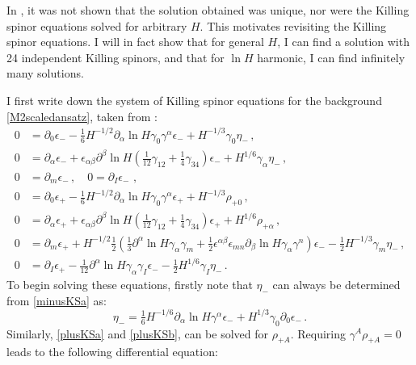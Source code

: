 \documentclass[11pt]{article}
\newcommand{\be}{\begin{equation}}
\newcommand{\ee}{\end{equation}}
\numberwithin{equation}{section}
\begin{document}
{{In \cite{Bergshoeff:2024nin}, it was not shown that the solution obtained was unique, nor were the Killing spinor equations solved for arbitrary $H$.
This motivates revisiting the Killing spinor equations.
I will in fact show that for general $H$, I can find a solution with 24 independent Killing spinors, and that for $\ln H$ harmonic, I can find infinitely many solutions.


I first write down the system of Killing spinor equations for the background \eqref{M2scaledansatz}, taken from \cite{Bergshoeff:2024nin}:
\begin{subequations}
\begin{align}
\label{minusKSa}
0 & = \partial_0 \epsilon_- -\tfrac16 H^{-1/2} \partial_\alpha \ln H \gamma_0 \gamma^\alpha \epsilon_- + H^{-1/3} \gamma_0 \eta_- \,,
\\[4pt]
\label{minusKSb}
0 & = \partial_\alpha \epsilon_- +  \epsilon_{\alpha \beta} \partial^\beta \ln H ( \tfrac{1}{12} \gamma_{12} + \tfrac14 \gamma_{34} ) \epsilon_-  + H^{1/6} \gamma_\alpha \eta_- \,,
\\[4pt] 
\label{minusKSc}
0 & = \partial_m \epsilon_-\,,
\quad
0  = \partial_I \epsilon_-\, \,,\\[4pt]
\label{plusKSa}
0 & = \partial_0 \epsilon_+ -\tfrac16 H^{-1/2} \partial_\alpha \ln H \gamma_0 \gamma^\alpha \epsilon_+ + H^{-1/3} \rho_{+0}\,,
\\[4pt]
\label{plusKSb}
0 & = \partial_\alpha \epsilon_+ +  \epsilon_{\alpha \beta} \partial^\beta \ln H ( \tfrac{1}{12} \gamma_{12} + \tfrac14 \gamma_{34} ) \epsilon_+  + H^{1/6} \rho_{+\alpha}\,,
\\[4pt]
\label{plusKSc}
0 & = \partial_m \epsilon_+ 
+ H^{-1/2} \tfrac12 ( \tfrac13  \partial^\alpha\ln H \gamma_\alpha \gamma_m 
+ \tfrac12 \epsilon^{\alpha \beta} \epsilon_{mn} \partial_\beta \ln H \gamma_\alpha \gamma^n ) \epsilon_- - \tfrac12 H^{-1/3} \gamma_m \eta_- \,,\\[4pt]
0 & = \partial_I \epsilon_+ - \tfrac{1}{12} \partial^\alpha \ln H \gamma_\alpha \gamma_I \epsilon_-
- \tfrac12 H^{1/6} \gamma_I \eta_- \,.
\label{plusKSd}
\end{align}
\end{subequations} 
To begin solving these equations, firstly note that $\eta_-$ can always be determined from \eqref{minusKSa} as:
\be
\eta_- = \tfrac16 H^{-1/6} \partial_\alpha \ln H \gamma^\alpha \epsilon_-
 + H^{1/3} \gamma_0 \partial_0 \epsilon_- \,.
\label{M2eta} 
\ee 
Similarly, \eqref{plusKSa} and \eqref{plusKSb}, can be solved for $\rho_{+A}$.
Requiring $\gamma^A \rho_{+A} = 0$ leads to the following differential equation:
}}
\end{document}
